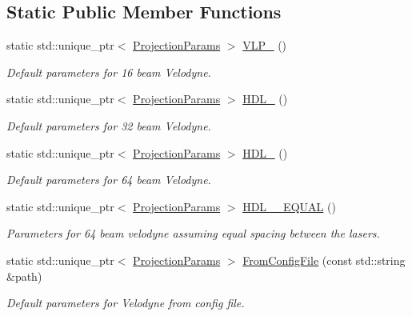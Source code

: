 \subsection*{Static Public Member Functions}
\begin{DoxyCompactItemize}
\item 
static std\+::unique\+\_\+ptr$<$ \hyperlink{classdepth__clustering_1_1ProjectionParams}{Projection\+Params} $>$ \hyperlink{classdepth__clustering_1_1ProjectionParams_aef7c0d212f6ab8909d0992ed8c19a45d}{V\+L\+P\+\_} ()
\begin{DoxyCompactList}\small\item\em Default parameters for 16 beam Velodyne. \end{DoxyCompactList}\item 
static std\+::unique\+\_\+ptr$<$ \hyperlink{classdepth__clustering_1_1ProjectionParams}{Projection\+Params} $>$ \hyperlink{classdepth__clustering_1_1ProjectionParams_a38a76a0e0f00f8f1b95b6108641703d6}{H\+D\+L\+\_} ()
\begin{DoxyCompactList}\small\item\em Default parameters for 32 beam Velodyne. \end{DoxyCompactList}\item 
static std\+::unique\+\_\+ptr$<$ \hyperlink{classdepth__clustering_1_1ProjectionParams}{Projection\+Params} $>$ \hyperlink{classdepth__clustering_1_1ProjectionParams_a40b8a22533ec69811ef4d3d01fb04a85}{H\+D\+L\+\_} ()
\begin{DoxyCompactList}\small\item\em Default parameters for 64 beam Velodyne. \end{DoxyCompactList}\item 
static std\+::unique\+\_\+ptr$<$ \hyperlink{classdepth__clustering_1_1ProjectionParams}{Projection\+Params} $>$ \hyperlink{classdepth__clustering_1_1ProjectionParams_a22a7d186bd32c86262e94843331230a1}{H\+D\+L\+\_\+\_\+\+E\+Q\+U\+AL} ()
\begin{DoxyCompactList}\small\item\em Parameters for 64 beam velodyne assuming equal spacing between the lasers. \end{DoxyCompactList}\item 
static std\+::unique\+\_\+ptr$<$ \hyperlink{classdepth__clustering_1_1ProjectionParams}{Projection\+Params} $>$ \hyperlink{classdepth__clustering_1_1ProjectionParams_ad58dde41a515eda5871998da5435dc42}{From\+Config\+File} (const std\+::string \&path)
\begin{DoxyCompactList}\small\item\em Default parameters for Velodyne from config file. \end{DoxyCompactList}\item 

\end{DoxyCompactItemize}
